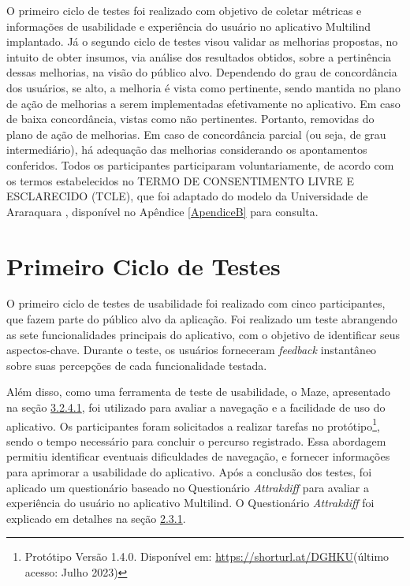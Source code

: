O primeiro ciclo de testes foi realizado com objetivo de coletar métricas e informações de usabilidade e experiência do usuário no aplicativo Multilind implantado. Já o segundo ciclo de testes visou validar as 
melhorias propostas, no intuito de obter insumos, via análise dos resultados obtidos, sobre a pertinência dessas melhorias, na visão do público alvo. Dependendo do grau de concordância dos usuários, se alto, a 
melhoria é vista como pertinente, sendo mantida no plano de ação de melhorias a serem implementadas efetivamente no aplicativo. Em caso de baixa concordância, vistas como não pertinentes. Portanto, removidas 
do plano de ação de melhorias. Em caso de concordância parcial (ou seja, de grau intermediário), há adequação das melhorias considerando os apontamentos conferidos. Todos os participantes participaram voluntariamente, 
de acordo com os termos estabelecidos no  TERMO DE CONSENTIMENTO LIVRE E ESCLARECIDO (TCLE), que foi adaptado do modelo da Universidade de Araraquara \cite{tcle}, disponível no Apêndice \ref{ApendiceB} para consulta.
 
\section{Primeiro Ciclo de Testes}
\label{sec:Primeiro Ciclo}
O primeiro ciclo de testes de usabilidade foi realizado com cinco participantes, que fazem parte do público alvo da aplicação. Foi realizado um teste abrangendo as sete funcionalidades 
principais do aplicativo, com o objetivo de identificar seus aspectos-chave. Durante o teste, os usuários forneceram \textit{feedback} instantâneo sobre suas percepções de cada funcionalidade testada. 

Além disso, como uma ferramenta de teste de usabilidade, o Maze, apresentado na seção \hyperref[{sec:Maze}]{3.2.4.1}, foi utilizado para avaliar a navegação e a facilidade de uso do aplicativo. Os participantes foram solicitados a realizar  
tarefas no protótipo\footnote{Protótipo Versão 1.4.0. Disponível em: \url{https://shorturl.at/DGHKU}(último acesso: Julho 2023)},  sendo o tempo
necessário para concluir o percurso registrado. Essa abordagem permitiu identificar eventuais dificuldades de navegação, e fornecer informações para aprimorar a usabilidade do aplicativo. Após a conclusão dos 
testes, foi aplicado um questionário baseado no Questionário \textit{Attrakdiff} para avaliar a experiência do usuário no aplicativo Multilind. O Questionário \textit{Attrakdiff} foi explicado em detalhes na seção \hyperref[sec:Medicao2]{2.3.1}.

